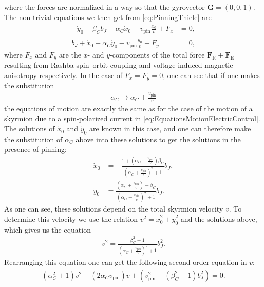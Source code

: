where the forces are normalized in a way so that the gyrovector $\mathbold{G} = (0, 0, 1)$. The non-trivial equations we then get from \eqref{eq:PinningThiele} are
\begin{subequations}
\label{eq:PinningThieleComponents}
\begin{align}
\label{eq:PinningThieleA}
-\dot{y}_0 - \beta_Cb_J - \alpha_C\dot{x}_0 - v_{\textrm{pin}}\frac{\dot{x}_0}{v} + F_x &= 0, \\
\label{eq:PinningThieleB}
b_J + \dot{x}_0 - \alpha_C\dot{y}_0 - v_{\textrm{pin}}\frac{\dot{y}_0}{v} + F_y &= 0,
\end{align}
\end{subequations}
where $F_x$ and $F_y$ are the $x$- and $y$-components of the total force $\mathbold{F}_{\text{R}} + \mathbold{F}_{\text{E}}$ resulting from Rashba spin--orbit coupling and voltage induced magnetic anisotropy respectively. In the case of $F_x = F_y = 0$, one can see that if one makes the substitution
\begin{align}
\alpha_C \rightarrow \alpha_C+\frac{v_{\textrm{pin}}}{v}
\end{align}
the equations of motion are exactly the same as for the case of the motion of a skyrmion due to a spin-polarized current in \eqref{eq:EquationsMotionElectricControl}. The solutions of $\dot{x}_0$ and $\dot{y}_0$ are known in this case, and one can therefore make the substitution of $\alpha_C$ above into these solutions to get the solutions in the presence of pinning:
\begin{subequations}
\begin{align}
\dot{x}_0 &= -\frac{1+(\alpha_C+\frac{v_{\textrm{pin}}}{v})\beta_C}{(\alpha_C+\frac{v_{\textrm{pin}}}{v})^2+1}b_J, \\
\dot{y}_0 &= \frac{(\alpha_C+\frac{v_{\textrm{pin}}}{v}) - \beta_C}{(\alpha_C+\frac{v_{\textrm{pin}}}{v})^2+1}b_J.
\end{align}
\end{subequations}
As one can see, these solutions depend on the total skyrmion velocity $v$. To determine this velocity we use the relation $v^2 = \dot{x}_0^2+\dot{y}_0^2$ and the solutions above, which gives us the equation
\begin{align}
v^2 = \frac{\beta_C^2+1}{(\alpha_C+\frac{v_{\textrm{pin}}}{v})^2+1}b_J^2.
\end{align}
Rearranging this equation one can get the following second order equation in $v$:
\begin{align}
(\alpha_C^2+1)v^2+(2\alpha_Cv_{\textrm{pin}})v + (v_{\textrm{pin}}^2-(\beta_C^2+1)b_J^2) = 0.
\end{align}
